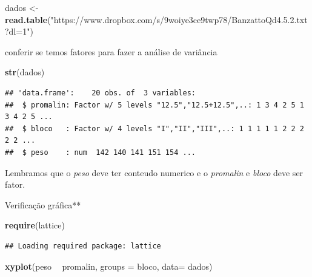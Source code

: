 \documentclass[
]{book}
\newenvironment{Shaded}{\begin{snugshade}}{\end{snugshade}}
\newcommand{\DataTypeTok}[1]{\textcolor[rgb]{0.13,0.29,0.53}{#1}}
\newcommand{\KeywordTok}[1]{\textcolor[rgb]{0.13,0.29,0.53}{\textbf{#1}}}
\newcommand{\NormalTok}[1]{#1}
\newcommand{\OperatorTok}[1]{\textcolor[rgb]{0.81,0.36,0.00}{\textbf{#1}}}
\newcommand{\StringTok}[1]{\textcolor[rgb]{0.31,0.60,0.02}{#1}}
\begin{document}
\begin{Shaded}
\begin{Highlighting}[]
\NormalTok{dados <-}\StringTok{ }\KeywordTok{read.table}\NormalTok{(}\StringTok{"https://www.dropbox.com/s/9woiye3ce9twp78/BanzattoQd4.5.2.txt?dl=1"}\NormalTok{) }
\end{Highlighting}
\end{Shaded}

conferir se temos fatores para fazer a análise de variância

\begin{Shaded}
\begin{Highlighting}[]
\KeywordTok{str}\NormalTok{(dados)}
\end{Highlighting}
\end{Shaded}

\begin{verbatim}
## 'data.frame':    20 obs. of  3 variables:
##  $ promalin: Factor w/ 5 levels "12.5","12.5+12.5",..: 1 3 4 2 5 1 3 4 2 5 ...
##  $ bloco   : Factor w/ 4 levels "I","II","III",..: 1 1 1 1 1 2 2 2 2 2 ...
##  $ peso    : num  142 140 141 151 154 ...
\end{verbatim}

Lembramos que o \emph{peso} deve ter conteudo numerico e o \emph{promalin} e \emph{bloco} deve ser fator.

\begin{Shaded}
\end{Shaded}

Verificação gráfica**

\begin{Shaded}
\begin{Highlighting}[]
\KeywordTok{require}\NormalTok{(lattice)}
\end{Highlighting}
\end{Shaded}

\begin{verbatim}
## Loading required package: lattice
\end{verbatim}

\begin{Shaded}
\begin{Highlighting}[]
\KeywordTok{xyplot}\NormalTok{(peso }\OperatorTok{~}\StringTok{ }\NormalTok{promalin, }
        \DataTypeTok{groups =}\NormalTok{ bloco, }
        \DataTypeTok{data=}\NormalTok{ dados)}
\end{Highlighting}
\end{Shaded}
\end{document}
